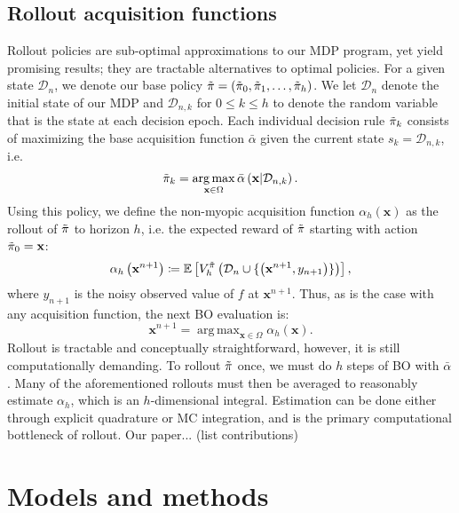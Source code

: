 \documentclass{article}
\DeclareMathOperator*{\argmax}{arg\,max}
\begin{document}
\subsection{Rollout acquisition functions}
Rollout policies are sub-optimal approximations to our MDP program, yet yield promising results; 
they are tractable alternatives to optimal policies.
For a given state $\mathcal{D}_n$, we denote 
our base policy $\Tilde{\pi} = (\Tilde{\pi}_0, \Tilde{\pi}_1, \dots, \Tilde{\pi}_h)$. We let
$\mathcal{D}_n$ denote the initial state of our MDP and $\mathcal{D}_{n,k}$ for $0 \leq k \leq h$ 
to denote the random variable that is the state at each decision epoch. Each individual decision rule
$\Tilde{\pi}_k$ consists of maximizing the base acquisition function $\bar{\alpha}$ given the current
state $s_k = \mathcal{D}_{n, k}$, i.e.
$$
\Tilde{\pi}_k = \argmax_{\textbf{x} \in \Omega} \bar{\alpha} \left( \textbf{x} | \mathcal{D}_{n,k}\right).
$$
Using this policy, we define the non-myopic acquisition function $\alpha_h\left(\textbf{x}\right)$ as
the rollout of $\Tilde{\pi}$ to horizon $h$, i.e. the expected reward of $\Tilde{\pi}$ starting with action
$\Tilde{\pi}_0 = \textbf{x}$:
$$
\alpha_h \left(\textbf{x}^{n+1}\right) \coloneqq \mathbb{E} \left[ 
V^{\Tilde{\pi}}_{h} \left( \mathcal{D}_{n} \cup \{ \left(
\textbf{x}^{n+1}, y_{n+1}
\right) \} \right) \right],
$$
where $y_{n+1}$ is the noisy observed value of $f$ at $\textbf{x}^{n+1}$. Thus, as is the case with
any acquisition function, the next BO evaluation is:
$$
\textbf{x}^{n+1} = \argmax_{\textbf{x} \in \Omega} \alpha_h\left(\textbf{x}\right).
$$
Rollout is tractable and conceptually straightforward, however, it is still computationally demanding.
To rollout $\Tilde{\pi}$ once, we must do $h$ steps of BO with $\bar{\alpha}$. Many of the
aforementioned rollouts must then be averaged to reasonably estimate $\alpha_h$, which is an
$h$-dimensional integral. Estimation can be done either through explicit quadrature or MC integration,
and is the primary computational bottleneck of rollout. Our paper... (list contributions)

\section{Models and methods}
\end{document}

